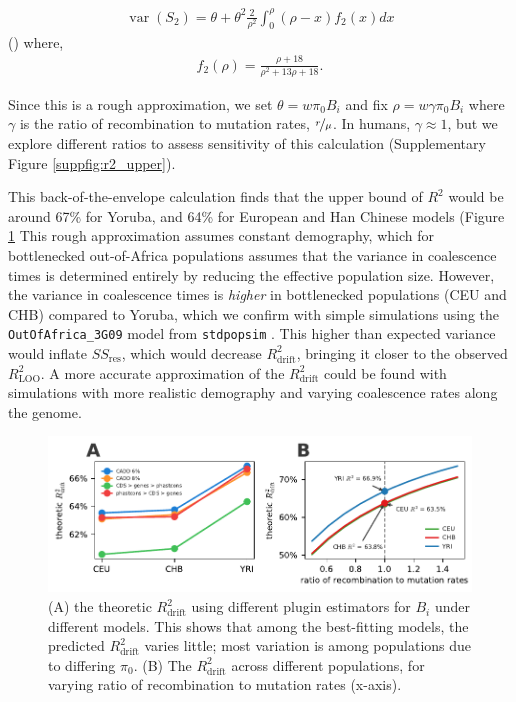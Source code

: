 \documentclass[11pt]{article}
\DeclareMathOperator{\var}{var}
\begin{document}
\begin{align}
    \var(S_2) = \theta + \theta^2 \frac{2}{\rho^2} \int_0^\rho (\rho - x) f_2(x) dx
\end{align}
(\cite[eq. 7.20]{Wakeley2009-ua}) where,
\begin{align}
    f_2(\rho) = \frac{\rho + 18}{\rho^2 + 13 \rho + 18}.
\end{align}

Since this is a rough approximation,  we set $\theta = w \pi_0 B_i$ and fix
$\rho = w \gamma \pi_0 B_i$ where $\gamma$ is the ratio of recombination to
mutation rates, $\nicefrac{r}{\mu}$. In humans, $\gamma \approx 1$, but we
explore different ratios to assess sensitivity of this calculation
(Supplementary Figure \ref{suppfig:r2_upper}). 

This back-of-the-envelope calculation finds that the upper bound of $R^2$ would
be around 67\% for Yoruba, and 64\% for European and Han Chinese models (Figure
\ref{suppfig:drift_r2} This rough approximation assumes constant demography,
which for bottlenecked out-of-Africa populations assumes that the variance in
coalescence times is determined entirely by reducing the effective population
size. However, the variance in coalescence times is \emph{higher} in
bottlenecked populations (CEU and CHB) compared to Yoruba, which we confirm
with simple simulations using the \texttt{OutOfAfrica\_3G09} model from
\texttt{stdpopsim} \parencite{Gutenkunst2009-pg,Adrion2020-cf}. This higher
than expected variance would inflate $SS_\text{res}$, which would decrease
$R_\text{drift}^2$, bringing it closer to the observed $R_\text{LOO}^2$. A more
accurate approximation of the $R_\text{drift}^2$ could be found with
simulations with more realistic demography and varying coalescence rates along
the genome.

\begin{figure}[htbp] \centering
    \includegraphics[width=\textwidth]{figures/supplementary/suppfigure_drift_R2.pdf}
    \caption{(A) the theoretic $R_\text{drift}^2$ using different plugin
        estimators for $B_i$ under different models. This shows that among the
        best-fitting models, the predicted $R_\text{drift}^2$ varies little;
        most variation is among populations due to differing $\pi_0$. (B) The 
        $R_\text{drift}^2$ across different populations, for varying ratio of recombination
        to mutation rates (x-axis).}
  \label{suppfig:drift_r2}
\end{figure}
\end{document}

